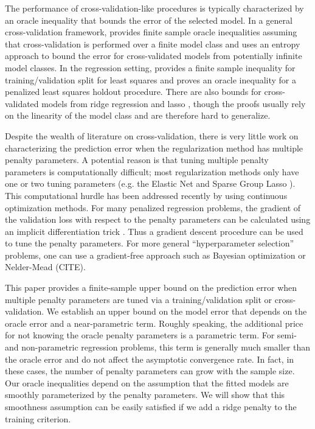\documentclass[12pt]{article}
\begin{document}
The performance of cross-validation-like procedures is typically characterized by an oracle inequality that bounds the error of the selected model. In a general cross-validation framework, \citet{van2003unified, van2004asymptotic} provides finite sample oracle inequalities assuming that cross-validation is performed over a finite model class and \citet{lecue2012oracle} uses an entropy approach to bound the error for cross-validated models from potentially infinite model classes. In the regression setting, \citet{gyorfi2006distribution} provides a finite sample inequality for training/validation split for least squares and \citet{wegkamp2003model} proves an oracle inequality for a penalized least squares holdout procedure. There are also bounds for cross-validated models from ridge regression and lasso \citep{golub1979generalized, chetverikov2016cross, chatterjee2015prediction}, though the proofs usually rely on the linearity of the model class and are therefore hard to generalize.

Despite the wealth of literature on cross-validation, there is very little work on characterizing the prediction error when the regularization method has multiple penalty parameters. A potential reason is that tuning multiple penalty parameters is computationally difficult; most regularization methods only have one or two tuning parameters (e.g. the Elastic Net and Sparse Group Lasso \citep{zou2003regression, simon2013sparse}). This computational hurdle has been addressed recently by using continuous optimization methods. For many penalized regression problems, the gradient of the validation loss with respect to the penalty parameters can be calculated using an implicit differentiation trick \citep{bengio2000gradient, foo2008efficient}. Thus a gradient descent procedure can be used to tune the penalty parameters. For more general ``hyperparameter selection'' problems, one can use a gradient-free approach such as Bayesian optimization \citet{snoek2012practical} or Nelder-Mead (CITE).

This paper provides a finite-sample upper bound on the prediction error when multiple penalty parameters are tuned via a training/validation split or cross-validation. We establish an upper bound on the model error that depends on the oracle error and a near-parametric term. Roughly speaking, the additional price for not knowing the oracle penalty parameters is a parametric term. For semi- and non-parametric regression problems, this term is generally much smaller than the oracle error and do not affect the asymptotic convergence rate. In fact, in these cases, the number of penalty parameters can grow with the sample size. Our oracle inequalities depend on the assumption that the fitted models are smoothly parameterized by the penalty parameters. We will show that this smoothness assumption can be easily satisfied if we add a ridge penalty to the training criterion. 
\end{document}

